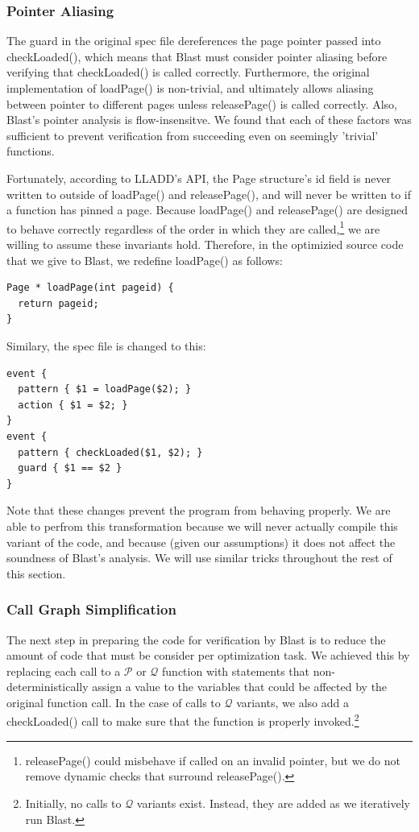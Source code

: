 \documentclass[10pt,letterpaper,twocolumn,english]{article}
\newcommand{\yad}{LLADD\xspace}
\newcommand{\pin}{loadPage()\xspace}
\newcommand{\unpin}{releasePage()\xspace}
\newcommand{\checkpage}{checkLoaded()\xspace}
\newcommand{\fP}{{$\mathcal P$}\xspace}
\newcommand{\fQ}{{$\mathcal Q$}\xspace}
\begin{document}
\subsubsection{Pointer Aliasing}

The guard in the original spec file dereferences the page pointer
passed into \checkpage, which means that Blast must consider pointer
aliasing before verifying that \checkpage is called correctly.
Furthermore, the original implementation of \pin is non-trivial, and
ultimately allows aliasing between pointer to different pages unless
\unpin is called correctly.  Also, Blast's pointer analysis is
flow-insensitve.  We found that each of these factors was sufficient
to prevent verification from succeeding even on seemingly 'trivial'
functions.  

Fortunately, according to \yad's API, the Page structure's id field is
never written to outside of \pin and \unpin, and will never be written
to if a function has pinned a page.  Because \pin and \unpin are
designed to behave correctly regardless of the order
in which they are called,\footnote{\unpin could misbehave if called on
an invalid pointer, but we do not remove dynamic checks that surround
\unpin.} we are willing to assume these invariants hold.  Therefore,
in the optimizied source code that we give to Blast, we redefine
\pin as follows:

\begin{verbatim}
Page * loadPage(int pageid) {
  return pageid;
}
\end{verbatim}
Similary, the spec file is changed to this:
\begin{verbatim}
event { 
  pattern { $1 = loadPage($2); }
  action { $1 = $2; }
}
event { 
  pattern { checkLoaded($1, $2); }  
  guard { $1 == $2 }
}
\end{verbatim}

Note that these changes prevent the program from behaving properly.
We are able to perfrom this transformation because we will never
actually compile this variant of the code, and because (given our
assumptions) it does not affect the soundness of Blast's analysis.  We
will use similar tricks throughout the rest of this section.

\subsubsection{Call Graph Simplification}

The next step in preparing the code for verification by Blast is to
reduce the amount of code that must be consider per optimization task.
We achieved this by replacing each call to a \fP or \fQ function with
statements that non-deterministically assign a value to the variables
that could be affected by the original function call.  In the case of
calls to \fQ variants, we also add a \checkpage call to make sure that
the function is properly invoked.\footnote{Initially, no calls to \fQ
variants exist.  Instead, they are added as we iteratively run Blast.}
\end{document}
